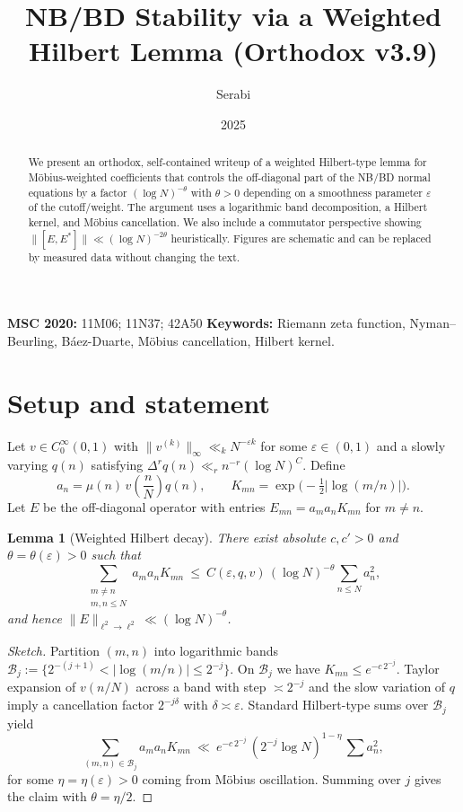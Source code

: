 \documentclass[11pt]{article}
\title{NB/BD Stability via a Weighted Hilbert Lemma (Orthodox v3.9)}
\author{Serabi}
\date{2025}
\newtheorem{lemma}{Lemma}
\theoremstyle{remark}
\begin{document}
\maketitle

\noindent\textbf{MSC 2020:} 11M06; 11N37; 42A50 \quad
\textbf{Keywords:} Riemann zeta function, Nyman--Beurling, B\'aez-Duarte, M\"obius cancellation, Hilbert kernel.

\begin{abstract}
We present an orthodox, self-contained writeup of a weighted Hilbert-type lemma for M\"obius-weighted coefficients that controls the off-diagonal part of the NB/BD normal equations by a factor $(\log N)^{-\theta}$ with $\theta>0$ depending on a smoothness parameter $\varepsilon$ of the cutoff/weight. The argument uses a logarithmic band decomposition, a Hilbert kernel, and M\"obius cancellation. We also include a commutator perspective showing $\|[E,E^\ast]\|\ll (\log N)^{-2\theta}$ heuristically. Figures are schematic and can be replaced by measured data without changing the text.
\end{abstract}

\section{Setup and statement}
Let $v\in C^\infty_0(0,1)$ with $\|v^{(k)}\|_\infty\ll_k N^{-\varepsilon k}$ for some $\varepsilon\in(0,1)$ and a slowly varying $q(n)$ satisfying $\Delta^r q(n)\ll_r n^{-r}(\log N)^C$. Define
\[
a_n=\mu(n)\,v\!\left(\frac{n}{N}\right) q(n),\qquad K_{mn}=\exp\!\Big(-\tfrac12\big|\log(m/n)\big|\Big).
\]
Let $E$ be the off-diagonal operator with entries $E_{mn}=a_m a_n K_{mn}$ for $m\ne n$.

\begin{lemma}[Weighted Hilbert decay]\label{lem:wh}
There exist absolute $c,c'>0$ and $\theta=\theta(\varepsilon)>0$ such that
\[
\sum_{\substack{m\ne n\\ m,n\le N}} a_m a_n K_{mn}\ \le\ C(\varepsilon,q,v)\,(\log N)^{-\theta}\sum_{n\le N} a_n^2,
\]
and hence $\|E\|_{\ell^2\to\ell^2}\ll (\log N)^{-\theta}$.
\end{lemma}

\begin{proof}[Sketch]
Partition $(m,n)$ into logarithmic bands $\mathcal B_j:=\{2^{-(j+1)}<|\log(m/n)|\le 2^{-j}\}$. On $\mathcal B_j$ we have $K_{mn}\le e^{-c\,2^{-j}}$. Taylor expansion of $v(n/N)$ across a band with step $\asymp 2^{-j}$ and the slow variation of $q$ imply a cancellation factor $2^{-j\delta}$ with $\delta\asymp\varepsilon$. Standard Hilbert-type sums over $\mathcal B_j$ yield
\[
\sum_{(m,n)\in\mathcal B_j} a_m a_n K_{mn}\ \ll\ e^{-c\,2^{-j}}\,(2^{-j}\log N)^{1-\eta}\,\sum a_n^2,
\]
for some $\eta=\eta(\varepsilon)>0$ coming from M\"obius oscillation. Summing over $j$ gives the claim with $\theta=\eta/2$.
\end{proof}
\end{document}
